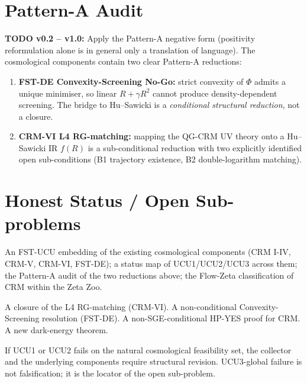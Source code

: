 \documentclass[11pt,a4paper]{article}
\theoremstyle{remark}
\begin{document}
\section{Pattern-A Audit}
\label{sec:pattern-a}

\textbf{TODO v0.2 -- v1.0:} Apply the Pattern-A negative form
(positivity reformulation alone is in general only a translation of
language). The cosmological components contain two clear Pattern-A
reductions:
\begin{enumerate}
\item \textbf{FST-DE Convexity-Screening No-Go:} strict convexity of
  $\Phi$ admits a unique minimiser, so linear $R+\gamma R^2$ cannot
  produce density-dependent screening. The bridge to Hu--Sawicki is
  a \emph{conditional structural reduction}, not a closure.
\item \textbf{CRM-VI L4 RG-matching:} mapping the QG-CRM UV theory
  onto a Hu--Sawicki IR $f(R)$ is a sub-conditional reduction with
  two explicitly identified open sub-conditions (B1 trajectory
  existence, B2 double-logarithm matching).
\end{enumerate}

\section{Honest Status / Open Sub-problems}
\label{sec:honest}

\begin{description}[leftmargin=2em,style=nextline]
\item[What this collector delivers.] An FST-UCU embedding of the
existing cosmological components (CRM I-IV, CRM-V, CRM-VI, FST-DE);
a status map of UCU1/UCU2/UCU3 across them; the Pattern-A audit of
the two reductions above; the Flow-Zeta classification of CRM
within the Zeta Zoo.
\item[What this collector does NOT deliver.] A closure of the L4
RG-matching (CRM-VI). A non-conditional Convexity-Screening
resolution (FST-DE). A non-SGE-conditional HP-YES proof for CRM.
A new dark-energy theorem.
\item[Falsification criterion.] If UCU1 or UCU2 fails on the
natural cosmological feasibility set, the collector and the
underlying components require structural revision. UCU3-global
failure is not falsification; it is the locator of the open
sub-problem.
\end{description}
\end{document}
